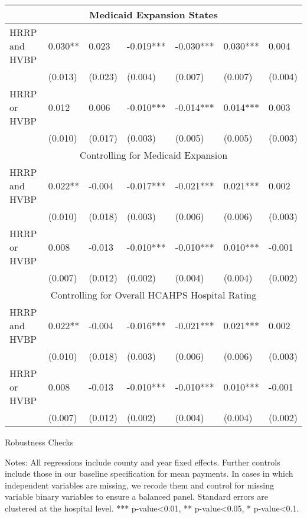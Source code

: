 \documentclass[12pt]{article}
\begin{document}
{\begin{tabular}{lllllll}
				\hline
\multicolumn{7}{c}{Medicaid Expansion States} 			\\			
			\hline							
HRRP and HVBP	&	0.030**	&	0.023	&	-0.019***	&	-0.030***	&	0.030***	&	0.004	\\
	&	(0.013)	&	(0.023)	&	(0.004)	&	(0.007)	&	(0.007)	&	(0.004)	\\
HRRP or HVBP	&	0.012	&	0.006	&	-0.010***	&	-0.014***	&	0.014***	&	0.003	\\
	&	(0.010)	&	(0.017)	&	(0.003)	&	(0.005)	&	(0.005)	&	(0.003)	\\
				\hline
\multicolumn{7}{c}{Controlling for Medicaid Expansion} 		\\		
			\hline									
HRRP and HVBP	&	0.022**	&	-0.004	&	-0.017***	&	-0.021***	&	0.021***	&	0.002	\\
	&	(0.010)	&	(0.018)	&	(0.003)	&	(0.006)	&	(0.006)	&	(0.003)	\\
HRRP or HVBP	&	0.008	&	-0.013	&	-0.010***	&	-0.010***	&	0.010***	&	-0.001	\\
	& (0.007)	&	(0.012)	&	(0.002)	&	(0.004)	&	(0.004)	&	(0.002)	\\
				\hline
\multicolumn{7}{c}{Controlling for Overall HCAHPS Hospital Rating} 		\\		
			\hline									
HRRP and HVBP	&	0.022**	&	-0.004	&	-0.016***	&	-0.021***	&	0.021***	&	0.002	\\
	&	(0.010)	&	(0.018)	&	(0.003)&	(0.006)	&	(0.006)	&	(0.003)	\\
HRRP or HVBP	&	0.008	&	-0.013	&	-0.010***	&	-0.010***	&	0.010***	&	-0.001	\\
	&	(0.007)	&	(0.012)	&	(0.002)	&	(0.004)	&	(0.004)	&	(0.002)	\\
	\hline
\end{tabular}
}
\setlength{\captionmargin}{.5 \textwidth} \addtolength{\captionmargin}{-.5\wd\gfxbox}
\begin{table}[!h]
\centering
\caption{Robustness Checks}
\label{tab:bymktshare}
\usebox{\gfxbox}
\par
\begin{minipage}{\wd\gfxbox}
\footnotesize
Notes: All regressions include county and year fixed effects. Further controls include those in our baseline specification for mean payments.  In cases in which independent variables are missing, we recode them and control for missing variable binary variables to ensure a balanced panel.  Standard errors are clustered at the hospital level.  *** p-value<0.01, ** p-value<0.05, * p-value<0.1.
\end{minipage}
\end{table}
\end{document}
